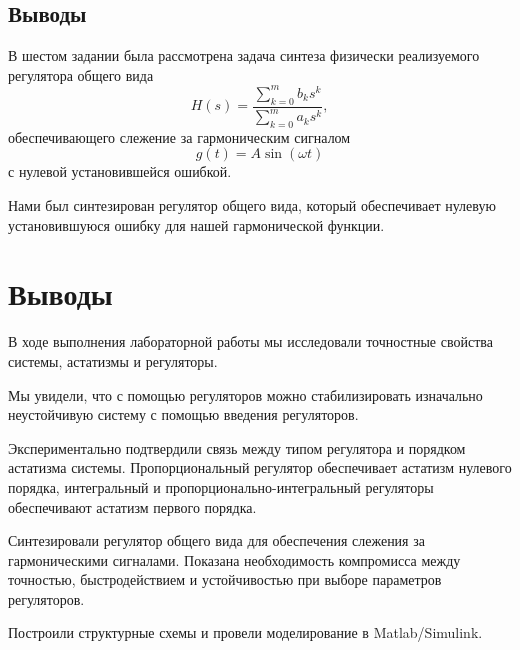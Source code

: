 \documentclass[a5paper, 10pt]{article}
\theoremstyle{definition}
\theoremstyle{plain}
\theoremstyle{remark}
\begin{document}
\subsection{Выводы}

В шестом задании была рассмотрена задача синтеза физически реализуемого
регулятора общего вида
\[
H(s)=\frac{\sum_{k=0}^{m} b_k s^k}{\sum_{k=0}^{m} a_k s^k},
\]
обеспечивающего слежение за гармоническим сигналом
\[
g(t)=A\sin(\omega t)
\]
с нулевой установившейся ошибкой.

Нами был синтезирован регулятор общего вида, который обеспечивает нулевую установившуюся ошибку для нашей гармонической функции.

\section{Выводы}

В ходе выполнения лабораторной работы мы исследовали точностные свойства системы, астатизмы и регуляторы.

Мы увидели, что с помощью регуляторов можно стабилизировать изначально неустойчивую систему с помощью введения регуляторов. 

Экспериментально подтвердили связь между типом регулятора и порядком астатизма системы. Пропорциональный регулятор обеспечивает астатизм нулевого порядка, интегральный и пропорционально-интегральный
регуляторы обеспечивают астатизм первого порядка.

Синтезировали регулятор общего вида для обеспечения слежения за
гармоническими сигналами.
Показана необходимость компромисса между точностью, быстродействием и устойчивостью при выборе параметров регуляторов. 

Построили структурные схемы и провели моделирование в Matlab/Simulink.
\end{document}
